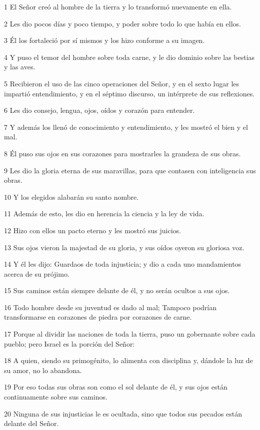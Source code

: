 \par 1 El Señor creó al hombre de la tierra y lo transformó nuevamente en ella.
\par 2 Les dio pocos días y poco tiempo, y poder sobre todo lo que había en ellos.
\par 3 Él los fortaleció por sí mismos y los hizo conforme a su imagen.
\par 4 Y puso el temor del hombre sobre toda carne, y le dio dominio sobre las bestias y las aves.
\par 5 Recibieron el uso de las cinco operaciones del Señor, y en el sexto lugar les impartió entendimiento, y en el séptimo discurso, un intérprete de sus reflexiones.
\par 6 Les dio consejo, lengua, ojos, oídos y corazón para entender.
\par 7 Y además los llenó de conocimiento y entendimiento, y les mostró el bien y el mal.
\par 8 Él puso sus ojos en sus corazones para mostrarles la grandeza de sus obras.
\par 9 Les dio la gloria eterna de sus maravillas, para que contasen con inteligencia sus obras.
\par 10 Y los elegidos alabarán su santo nombre.
\par 11 Además de esto, les dio en herencia la ciencia y la ley de vida.
\par 12 Hizo con ellos un pacto eterno y les mostró sus juicios.
\par 13 Sus ojos vieron la majestad de su gloria, y sus oídos oyeron su gloriosa voz.
\par 14 Y él les dijo: Guardaos de toda injusticia; y dio a cada uno mandamientos acerca de su prójimo.
\par 15 Sus caminos están siempre delante de él, y no serán ocultos a sus ojos.
\par 16 Todo hombre desde su juventud es dado al mal; Tampoco podrían transformarse en corazones de piedra por corazones de carne.
\par 17 Porque al dividir las naciones de toda la tierra, puso un gobernante sobre cada pueblo; pero Israel es la porción del Señor:
\par 18 A quien, siendo su primogénito, lo alimenta con disciplina y, dándole la luz de su amor, no lo abandona.
\par 19 Por eso todas sus obras son como el sol delante de él, y sus ojos están continuamente sobre sus caminos.
\par 20 Ninguna de sus injusticias le es ocultada, sino que todos sus pecados están delante del Señor.
